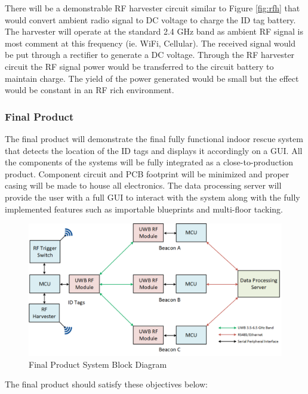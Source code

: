 \bigskip
There will be a demonstrable RF harvester circuit similar to Figure \ref{fig:rfh} that would convert ambient radio signal to DC voltage to charge the ID tag battery. The harvester will operate at the standard 2.4 GHz band as ambient RF signal is most comment at this frequency (ie. WiFi, Cellular). The received signal would be put through a rectifier to generate a DC voltage. Through the RF harvester circuit the RF signal power would be transferred to the circuit battery to maintain charge. The yield of the power generated would be small but the effect would be constant in an RF rich environment.

\break
\subsubsection{Final Product}
\bigskip
The final product will demonstrate the final fully functional indoor rescue system that detects the location of the ID tags and displays it accordingly on a GUI. All the components of the systems will be fully integrated as a close-to-production product. Component circuit and \Gls{PCB} footprint will be minimized and proper casing will be made to house all electronics. The data processing server will provide the user with a full GUI to interact with the system along with the fully implemented features such as importable blueprints and multi-floor tacking. 

\begin{figure}[h!]
    \centering
    \includegraphics[width=\linewidth]{./images/03_sys_Final.png}
    \caption{Final Product System Block Diagram}
    \label{final_prod_sys_blk}
\end{figure}
\bigskip

The final product should satisfy these objectives below:

